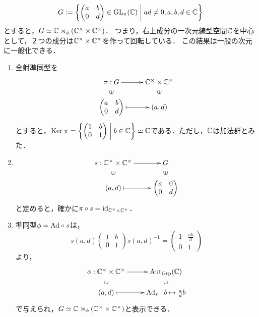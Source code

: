 \documentclass[uplatex,dvipdfmx]{jsreport}
\begin{document}
\begin{example}[上三角行列の空間]\label{exp-upper-trianguler-matrix}
    \[G:=\left\{\begin{pmatrix}a&b\\0&d\end{pmatrix}\in \mathrm{GL}_n(\mathbb{C})\;\middle|\;ad\ne 0,a,b,d\in\mathbb{C}\right\}\]
    とすると，$G\simeq\mathbb{C}\rtimes_\phi(\mathbb{C}^\times\times\mathbb{C}^\times)$．
    つまり，右上成分の一次元線型空間$\mathbb{C}$を中心として，２つの成分は$\mathbb{C}^\times\times\mathbb{C}^\times$を作って回転している．
    この結果は一般の次元に一般化できる．
    \begin{enumerate}
        \item 全射準同型を \[\xymatrix@R-2pc{
            \pi:G\ar[r]&\C^\times\times\C^\times\\
            \rotatebox[origin=c]{90}{$\in$}&\rotatebox[origin=c]{90}{$\in$}\\
            {\begin{pmatrix}a&b\\0&d\end{pmatrix}}\ar@{|->}[r]&(a,d)
        }\]
        とすると，$\mathrm{Ker}\;\pi=\left\{\begin{pmatrix}1&b\\0&1\end{pmatrix}\;\middle|\;b\in\mathbb{C}\right\}\simeq\mathbb{C}$である．ただし，$\mathbb{C}$は加法群とみた．
        \item \[\xymatrix@R-2pc{
            s:\C^\times\times\C^\times\ar[r]&G\\
            \rotatebox[origin=c]{90}{$\in$}&\rotatebox[origin=c]{90}{$\in$}\\
            (a,d)\ar@{|->}[r]&{\begin{pmatrix}a&0\\0&d\end{pmatrix}}
        }\]
        と定めると，確かに$\pi\circ s=\mathrm{id}_{\mathbb{C}^\times\times\mathbb{C}^\times}$．
        \item 準同型$\phi=\mathrm{Ad}\circ s$は，
        \[s(a,d)\begin{pmatrix}1&b\\0&1\end{pmatrix}s(a,d)^{-1}=\begin{pmatrix}1&\frac{ab}{d}\\0&1\end{pmatrix}\]
        より，
        \[\xymatrix@R-2pc{
            \phi:\C^\times\times\C^\times\ar[r]&\Aut_\Grp(\C)\\
            \rotatebox[origin=c]{90}{$\in$}&\rotatebox[origin=c]{90}{$\in$}\\
            (a,d)\ar@{|->}[r]&\Ad_s:b\mapsto\frac{a}{d}b
        }\]
        で与えられ，$G\simeq\mathbb{C}\rtimes_\phi(\mathbb{C}^\times\times\mathbb{C}^\times)$と表示できる．
    \end{enumerate}
\end{example}
\end{document}
